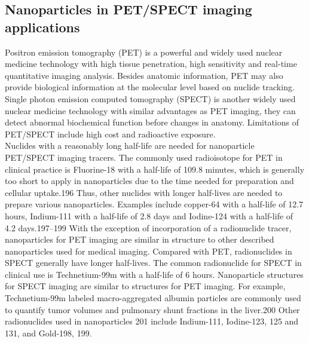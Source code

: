 \documentclass{article}
\begin{document}
\subsection*{ Nanoparticles in PET/SPECT imaging applications}
Positron emission tomography (PET) is a powerful and widely used nuclear medicine technology with high tissue penetration, high sensitivity and real-time quantitative imaging analysis. Besides anatomic information, PET may also provide biological information at the molecular level based on nuclide tracking. Single photon emission computed tomography (SPECT) is another widely used nuclear medicine technology with similar advantages as PET imaging, they can detect abnormal biochemical function before changes in anatomy. Limitations of PET/SPECT include high cost and radioactive exposure.\\ Nuclides with a reasonably long half-life are needed for nanoparticle PET/SPECT imaging tracers. The commonly used radioisotope for PET in clinical practice is Fluorine-18 with a half-life of 109.8 minutes, which is generally too short to apply in nanoparticles due to the time needed for preparation and cellular uptake.196 Thus, other nuclides with longer half-lives are needed to prepare various nanoparticles. Examples include copper-64 with a half-life of 12.7 hours, Indium-111 with a half-life of 2.8 days and Iodine-124 with a half-life of 4.2 days.197–199 With the exception of incorporation of a radionuclide tracer, nanoparticles for PET imaging are similar in structure to other described nanoparticles used for medical imaging. Compared with PET, radionuclides in SPECT generally have longer half-lives. The common radionuclide for SPECT in clinical use is Technetium-99m with a half-life of 6 hours. Nanoparticle structures for SPECT imaging are similar to structures for PET imaging. For example, Technetium-99m labeled macro-aggregated albumin particles are commonly used to quantify tumor volumes and pulmonary shunt fractions in the liver.200 Other radionuclides used in nanoparticles 201 include Indium-111, Iodine-123, 125 and 131, and Gold-198, 199.
\begin{itemize}
     
    
\end{itemize}





 
 
\end{document}
